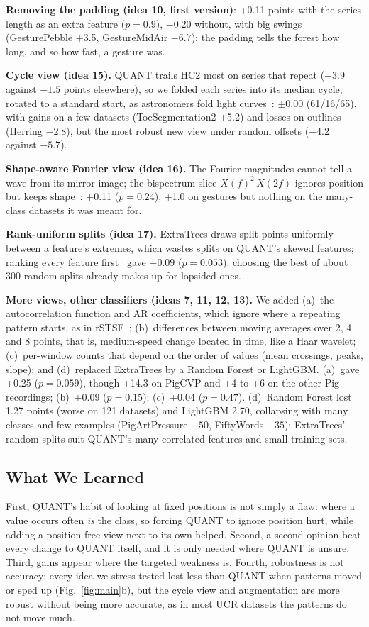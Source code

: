 \documentclass[conference]{IEEEtran}
\begin{document}
\textbf{Removing the padding (idea 10, first version)}: +0.11 points with the series length as an extra feature ($p=0.9$), $-0.20$ without, with big swings (GesturePebble +3.5, GestureMidAir $-6.7$): the padding tells the forest how long, and so how fast, a gesture was.

\textbf{Cycle view (idea 15).} QUANT trails HC2 most on series that repeat ($-3.9$ against $-1.5$ points elsewhere), so we folded each series into its median cycle, rotated to a standard start, as astronomers fold light curves~\cite{rebbapragada}: $\pm$0.00 (61/16/65), with gains on a few datasets (ToeSegmentation2 +5.2) and losses on outlines (Herring $-2.8$), but the most robust new view under random offsets ($-4.2$ against $-5.7$).

\textbf{Shape-aware Fourier view (idea 16).} The Fourier magnitudes cannot tell a wave from its mirror image; the bispectrum slice $X(f)^2\,\overline{X(2f)}$ ignores position but keeps shape~\cite{bispectrum}: +0.11 ($p=0.24$), +1.0 on gestures but nothing on the many-class datasets it was meant for.

\textbf{Rank-uniform splits (idea 17).} ExtraTrees draws split points uniformly between a feature's extremes, which wastes splits on QUANT's skewed features; ranking every feature first~\cite{galili} gave $-0.09$ ($p=0.053$): choosing the best of about 300 random splits already makes up for lopsided ones.

\textbf{More views, other classifiers (ideas 7, 11, 12, 13).} We added (a)~the autocorrelation function and AR coefficients, which ignore where a repeating pattern starts, as in rSTSF~\cite{rstsf}; (b)~differences between moving averages over 2, 4 and 8 points, that is, medium-speed change located in time, like a Haar wavelet; (c)~per-window counts that depend on the order of values (mean crossings, peaks, slope); and (d)~replaced ExtraTrees by a Random Forest or LightGBM. (a)~gave +0.25 ($p=0.059$), though +14.3 on PigCVP and +4 to +6 on the other Pig recordings; (b)~+0.09 ($p=0.15$); (c)~+0.04 ($p=0.47$). (d)~Random Forest lost 1.27 points (worse on 121 datasets) and LightGBM 2.70, collapsing with many classes and few examples (PigArtPressure $-50$, FiftyWords $-35$): ExtraTrees' random splits suit QUANT's many correlated features and small training sets.

\subsection{What We Learned}
First, QUANT's habit of looking at fixed positions is not simply a flaw: where a value occurs often \emph{is} the class, so forcing QUANT to ignore position hurt, while adding a position-free view next to its own helped. Second, a second opinion beat every change to QUANT itself, and it is only needed where QUANT is unsure. Third, gains appear where the targeted weakness is. Fourth, robustness is not accuracy: every idea we stress-tested lost less than QUANT when patterns moved or sped up (Fig.~\ref{fig:main}b), but the cycle view and augmentation are more robust without being more accurate, as in most UCR datasets the patterns do not move much.
\end{document}

